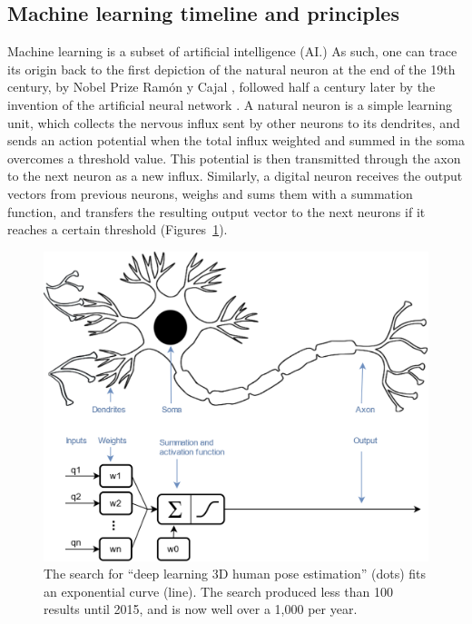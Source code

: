 \subsection{Machine learning timeline and principles}

Machine learning is a subset of artificial intelligence (AI.) As such, one can trace its origin back to the first depiction of the natural neuron at the end of the 19th century, by Nobel Prize Ramón y Cajal \cite{Lopez2006}, followed half a century later by the invention of the artificial neural network \cite{Mcculloch1943}. A natural neuron is a simple learning unit, which collects the nervous influx sent by other neurons to its dendrites, and sends an action potential when the total influx weighted and summed in the soma overcomes a threshold value. This potential is then transmitted through the axon to the next neuron as a new influx. Similarly, a digital neuron receives the output vectors from previous neurons, weighs and sums them with a summation function, and transfers the resulting output vector to the next neurons if it reaches a certain threshold (Figures~\ref{fig_neuron}). 

\begin{figure}[hbtp]
	\centering
	\def\svgwidth{1\columnwidth}
	\fontsize{10pt}{10pt}\selectfont
	\includegraphics[width=\linewidth]{"../Chap2/Figures/Fig_neuron.png"}
	\caption{The search for “deep learning 3D human pose estimation” (dots) fits an exponential curve (line). The search produced less than 100 results until 2015, and is now well over a 1,000 per year.}
	\label{fig_neuron}
\end{figure}


